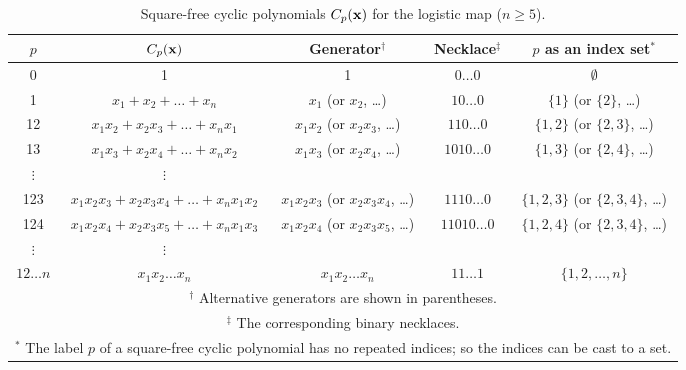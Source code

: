 \documentclass[twocolumn]{revtex4-1}
\begin{document}
\begin{table*}[t]\footnotesize
\caption{Square-free cyclic polynomials $C_p(\mathbf{x})$ for the logistic map ($n \ge 5$).}
\begin{center}
\begin{tabular}{c c c c c}
\hline
$p$ & $C_p(\mathbf{x})$ & Generator$^\dagger$ & Necklace$^\ddagger$ & $p$ as an index set$^*$\\
\hline
0             & 1 & 1 & $0\ldots0$ & $\emptyset$ \\
1             & $x_1 + x_2 + \dots + x_n$
              & $x_1$ (or $x_2$, \ldots)
              & $10\ldots0$
              & $\{1\}$ (or $\{2\}$, \ldots) \\
12            & $x_1 x_2 + x_2 x_3 + \dots + x_n x_1$
              & $x_1 x_2$ (or $x_2 x_3$, \ldots)
              & $110\ldots0$
              & $\{1, 2\}$ (or $\{2, 3\}$, \ldots) \\
13            & $x_1 x_3 + x_2 x_4 + \dots + x_n x_2$
              & $x_1 x_3$ (or $x_2 x_4$, \ldots)
              & $1010\ldots0$
              & $\{1, 3\}$ (or $\{2, 4\}$, \ldots) \\
$\vdots$      & $\vdots$ \\
123           & \hspace{1mm}$x_1 x_2 x_3 + x_2 x_3 x_4 + \dots + x_n x_1 x_2$\hspace{1mm}
              & \hspace{1mm}$x_1 x_2 x_3$ (or $x_2 x_3 x_4$, \ldots)\hspace{1mm}
              & $1110\ldots0$
              & $\{1, 2, 3\}$ (or $\{2, 3, 4\}$, \ldots) \\
124           & $x_1 x_2 x_4 + x_2 x_3 x_5 + \dots + x_n x_1 x_3$
              & $x_1 x_2 x_4$ (or $x_2 x_3 x_5$, \ldots)
              & $11010\ldots0$
              & $\{1, 2, 4\}$ (or $\{2, 3, 4\}$, \ldots) \\
$\vdots$      & $\vdots$ \\
$12\dots n$  & $x_1 x_2 \dots x_n$
              & $x_1 x_2 \dots x_n$
              & $11\ldots1$
              & $\{1, 2, \ldots, n\}$  \\
\hline
\multicolumn{5}{p{\linewidth}}{
$^\dagger$ Alternative generators are shown in parentheses.
}\\
\multicolumn{5}{p{\linewidth}}{
$^\ddagger$ The corresponding binary necklaces.
}\\
\multicolumn{5}{p{\linewidth}}{
$^*$ The label $p$ of a square-free cyclic polynomial
    has no repeated indices;
    so the indices can be cast to a set.
}\\
\hline
\end{tabular}
\end{center}
\label{tab:sqrfreepoly}
\end{table*}
\end{document}
